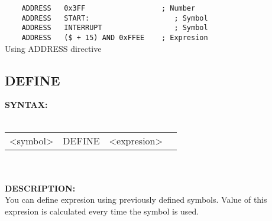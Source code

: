                         \begin{code}[h!]
                                \verb'    '{\color{highlight_directive}\verb'ADDRESS'}\verb'   '{\color{highlight_constant}\verb'0x3FF'}\verb'                  '{\color{highlight_comment}\verb'; Number'}\\
                                \verb'    '{\color{highlight_directive}\verb'ADDRESS'}\verb'   '{\color{highlight_label}\verb'START:'}\verb'                    '{\color{highlight_comment}\verb'; Symbol'}\\
                                \verb'    '{\color{highlight_directive}\verb'ADDRESS'}\verb'   '{\color{highlight_label}\verb'INTERRUPT'}\verb'                 '{\color{highlight_comment}\verb'; Symbol'}\\
                                \verb'    '{\color{highlight_directive}\verb'ADDRESS'}\verb'   '{\color{highlight_constant}\verb'($ + 15) AND 0xFFEE'}\verb'    '{\color{highlight_comment}\verb'; Expresion'}\\
                        \caption{Using ADDRESS directive}
                        \end{code}


                \subsection{DEFINE}
                \textbf{SYNTAX:}\\
                \\ {
                        \texttt{}
                        \begin{tabular}[h!]{llll}
                                { \color{highlight_symbol} <symbol> }  &
                                { \color{highlight_directive} DEFINE } &
                                { \color{highlight_constant} <expresion> } & { \color{highlight_comment}  }\\
                        \end{tabular}
                    }\\
                    \\

                \textbf{DESCRIPTION:}\\
                You can define expresion using previously defined symbols. Value of this expresion is calculated every time the symbol is used.


